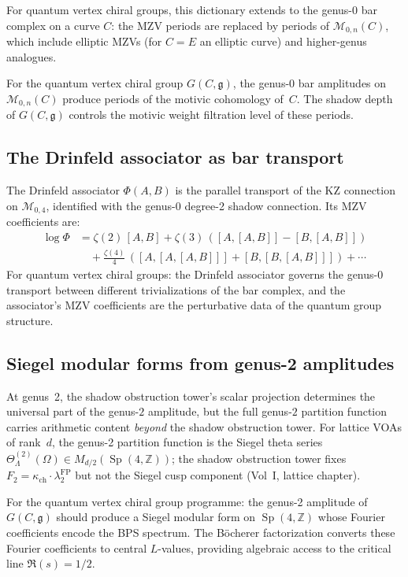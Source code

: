 \documentclass[11pt]{article}
\newcommand{\cM}{\mathcal{M}}
\newcommand{\fg}{\mathfrak{g}}
\newcommand{\Z}{\mathbb{Z}}
\newcommand{\Sp}{\operatorname{Sp}}
\begin{document}
For quantum vertex chiral groups, this dictionary extends to
the genus-0 bar complex on a curve $C$:
the MZV periods are replaced by periods of $\cM_{0,n}(C)$,
which include elliptic MZVs (for $C = E$ an elliptic curve)
and higher-genus analogues.

\begin{conjecture}
For the quantum vertex chiral group $G(C, \fg)$,
the genus-0 bar amplitudes on $\cM_{0,n}(C)$ produce
periods of the motivic cohomology of~$C$.
The shadow depth of $G(C, \fg)$ controls the
motivic weight filtration level of these periods.
\end{conjecture}

\subsection{The Drinfeld associator as bar transport}

The Drinfeld associator $\Phi(A, B)$ is the parallel transport
of the KZ connection on $\cM_{0,4}$, identified with the
genus-0 degree-2 shadow connection. Its MZV coefficients are:
\begin{align*}
\log \Phi &= \zeta(2)\,[A,B]
+ \zeta(3)\,([A,[A,B]] - [B,[A,B]]) \\
&\quad + \tfrac{\zeta(4)}{4}\,([A,[A,[A,B]]] + [B,[B,[A,B]]])
+ \cdots
\end{align*}
For quantum vertex chiral groups: the Drinfeld associator governs
the genus-0 transport between different trivializations of the
bar complex, and the associator's MZV coefficients are the
perturbative data of the quantum group structure.

\subsection{Siegel modular forms from genus-2 amplitudes}

At genus~2, the shadow obstruction tower's scalar projection
determines the universal part of the genus-$2$ amplitude,
but the full genus-$2$ partition function carries
arithmetic content \emph{beyond} the shadow obstruction tower.
For lattice VOAs of rank~$d$, the genus-2 partition function is
the Siegel theta series $\Theta_\Lambda^{(2)}(\Omega) \in
M_{d/2}(\Sp(4,\Z))$; the shadow obstruction tower fixes
$F_2 = \kappa_{\mathrm{ch}} \cdot \lambda_2^{\mathrm{FP}}$ but not the
Siegel cusp component (Vol~I, lattice chapter).

For the quantum vertex chiral group programme:
the genus-2 amplitude of $G(C, \fg)$ should produce a Siegel
modular form on $\Sp(4,\Z)$ whose Fourier coefficients encode
the BPS spectrum. The B\"ocherer factorization converts these
Fourier coefficients to central $L$-values, providing algebraic
access to the critical line $\Re(s) = 1/2$.
\end{document}
